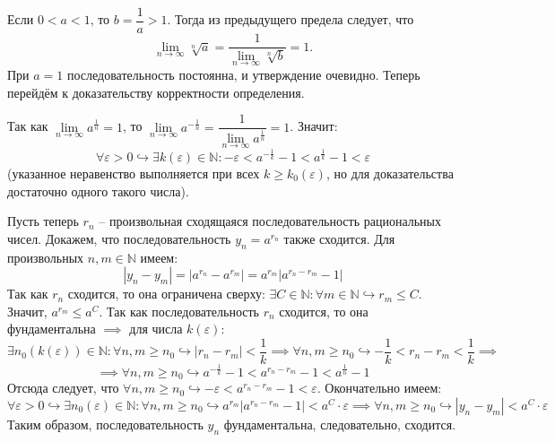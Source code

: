 \documentclass[12pt, a4paper, reqno]{article}
\begin{document}
    Если $0 < a < 1$, то $b = \dfrac{1}{a} > 1$. Тогда из предыдущего предела следует, что
    \begin{equation*}
        \lim\limits_{n\to\infty} \sqrt[n]{a} = \dfrac{1}{\lim\limits_{n\to\infty} \sqrt[n]{b}} = 1.
    \end{equation*}
    При $a = 1$ последовательность постоянна, и утверждение очевидно. Теперь перейдём к
    доказательству корректности определения.

    Так как $\lim\limits_{n\to\infty} a^{\frac{1}{n}} = 1$, то $\lim\limits_{n\to\infty}
    a^{-\frac{1}{n}} = \dfrac{1}{\lim\limits_{n\to\infty} a^{\frac{1}{n}}} = 1$. Значит:
    \begin{equation*}
        \forall\varepsilon > 0\hookrightarrow\exists k(\varepsilon)\in\mathbb{N}: -\varepsilon <
        a^{-\frac{1}{k}} - 1 < a^{\frac{1}{k}} - 1 < \varepsilon
    \end{equation*}
    (указанное неравенство выполняется при всех $k \geq k_0(\varepsilon)$, но для доказательства
    достаточно одного такого числа).

    Пусть теперь $r_n$ -- произвольная сходящаяся последовательность рациональных чисел. Докажем,
    что последовательность $y_n = a^{r_n}$ также сходится. Для произвольных $n, m\in\mathbb{N}$
    имеем:
    \begin{equation*}
        |y_n - y_m| = |a^{r_n} - a^{r_m}| = a^{r_m}|a^{r_n - r_m} - 1|
    \end{equation*}
    Так как $r_n$ сходится, то она ограничена сверху: $\exists C\in\mathbb{N}: \forall m \in
    \mathbb{N}\hookrightarrow r_m \leq C$. Значит, $a^{r_m} \leq a^C$. Так как последовательность
    $r_n$ сходится, то она фундаментальна $\implies$ для числа $k(\varepsilon)$:
    \begin{equation*}
        \exists n_0(k(\varepsilon))\in\mathbb{N}: \forall n, m \geq n_0 \hookrightarrow |r_n - r_m|
        < \dfrac{1}{k} \implies \forall n, m \geq n_0 \hookrightarrow -\dfrac{1}{k} < r_n - r_m <
        \dfrac{1}{k} \implies
    \end{equation*}
    \begin{equation*}
        \implies \forall n, m \geq n_0\hookrightarrow a^{-\frac{1}{k}} - 1 < a^{r_n - r_m} - 1 <
        a^{\frac{1}{n}} - 1
    \end{equation*}
    Отсюда следует, что $\forall n, m \geq n_0\hookrightarrow -\varepsilon < a^{r_n - r_m} - 1 <
    \varepsilon$. Окончательно имеем:
    \begin{equation*}
        \forall\varepsilon > 0\hookrightarrow \exists n_0(\varepsilon)\in\mathbb{N}: \forall n, m
        \geq n_0 \hookrightarrow a^{r_m}|a^{r_n - r_m} - 1| < a^C\cdot\varepsilon \implies \forall
        n, m \geq n_0 \hookrightarrow |y_n - y_m| < a^C\cdot\varepsilon
    \end{equation*}
    Таким образом, последовательность $y_n$ фундаментальна, следовательно, сходится.
\end{document}

